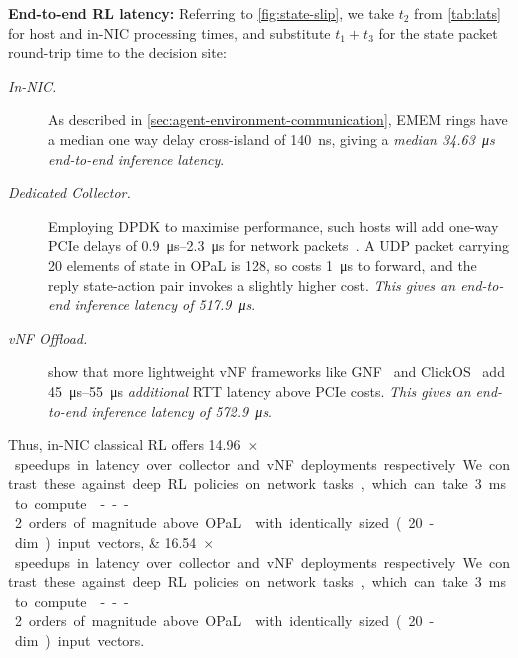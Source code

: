 \documentclass[
sigconf,natbib=false
,anonymous=true
,10pt
]{acmart}
\newcommand{\fakepara}[1]{\noindent\textbf{#1:}}
\newcommand{\approachshort}{OPaL}
\begin{document}
\fakepara{End-to-end RL latency}
Referring to \cref{fig:state-slip}, we take $t_2$ from \cref{tab:lats} for host and in-NIC processing times, and substitute $t_1+t_3$ for the state packet round-trip time to the decision site:
\begin{description}
	\item[\emph{In-NIC.}] As described in \cref{sec:agent-environment-communication}, EMEM rings have a median one way delay cross-island of \SI{140}{\nano\second}, giving a \emph{median \SI{34.63}{\micro\second} end-to-end inference latency}.
	\item[\emph{Dedicated Collector.}] Employing DPDK to maximise performance, such hosts will add one-way PCIe delays of \SIrange{0.9}{2.3}{\micro\second} for network packets~\parencite{DBLP:conf/sigcomm/NeugebauerAZAL018}.
	A UDP packet carrying \num{20} elements of state in \approachshort{} is \SI{128}{\byte}, so costs \SI{1}{\micro\second} to forward, and the reply state-action pair invokes a slightly higher cost.
	\emph{This gives an end-to-end inference latency of \SI{517.9}{\micro\second}}.
	\item[\emph{vNF Offload.}] \Textcite{DBLP:journals/cm/CzivaP17} show that more lightweight vNF frameworks like GNF~\parencite{DBLP:journals/cm/CzivaP17} and ClickOS~\parencite{DBLP:conf/nsdi/MartinsAROHBH14} add \SIrange{45}{55}{\micro\second} \emph{additional} RTT latency above PCIe costs.
	\emph{This gives an end-to-end inference latency of \SI{572.9}{\micro\second}}.
\end{description}
Thus, in-NIC classical RL offers \SIlist{14.96;16.54}{$\times$} speedups in latency over collector and vNF deployments respectively.
We contrast these against deep RL policies on network tasks, which can take \SI{3}{\milli\second} to compute~\parencite{DBLP:journals/corr/abs-1910-04054}---2 orders of magnitude above \approachshort{} with identically sized (20-dim) input vectors.
\end{document}
